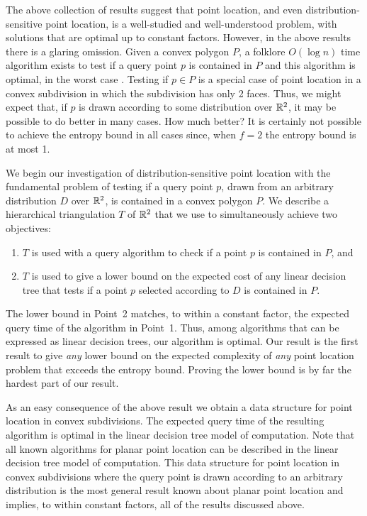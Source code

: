\documentclass[charterfonts,lotsofwhite]{patmorin}
\begin{document}
The above collection of results suggest that point location, and even
distribution-sensitive point location, is a well-studied and
well-understood problem, with solutions that are optimal up to
constant factors.   However, in the above results there is a glaring
omission.  Given a convex polygon $P$, a folklore $O(\log n)$ time
algorithm exists to test if a query point $p$ is contained in $P$ and
this algorithm is optimal, in the worst case \cite{ps85}.  Testing if
$p\in P$ is a special case of point location in a convex subdivision
in which the subdivision has only 2 faces.  Thus, we might expect that, if
$p$ is drawn according to some distribution over $\mathbb{R}^2$, it may be
possible to do better in many cases. How much better?  It is certainly
not possible to achieve the entropy bound in all cases since, when
$f=2$ the entropy bound is at most 1.

We begin our investigation of distribution-sensitive point location
with the fundamental problem of testing if a query point $p$, drawn
from an arbitrary distribution $D$ over $\mathbb{R}^2$, is contained in a
convex polygon $P$.  We describe a hierarchical triangulation $T$ of
$\mathbb{R}^2$ that we use to simultaneously achieve two objectives:
\begin{enumerate}
\item $T$ is used with a query algorithm to check if a point $p$ 
	is contained in $P$, and
\item $T$ is used to give a lower bound on the expected cost of
	any linear decision tree that tests if a point $p$ selected
	according to $D$ is contained in $P$.
\end{enumerate}
The lower bound in Point~2 matches, to within a constant factor, the
expected query time of the algorithm in Point~1.  Thus, among
algorithms that can be expressed as linear decision trees, our
algorithm is optimal. Our result is the first result to give
\emph{any} lower bound on the expected complexity of \emph{any} point
location problem that exceeds the entropy bound. Proving the lower
bound is by far the hardest part of our result.  

As an easy consequence of the above result we obtain a data structure
for point location in convex subdivisions.  The expected query time of
the resulting algorithm is optimal in the linear decision tree model
of computation. Note that all known algorithms for planar point
location can be described in the linear decision tree model of
computation.  This data structure for point location in convex
subdivisions where the query point is drawn according to an arbitrary
distribution is the most general result known about planar point
location and implies, to within constant factors, all of the results
discussed above.
\end{document}
